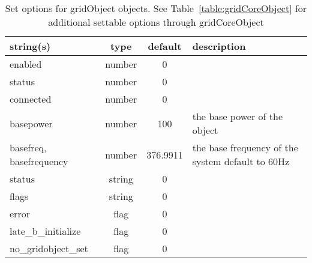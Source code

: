 \begin{table}[ht]
\centering
\begin{tabular}{p{5cm} c c p{7cm}}
\hline
string(s) & type & default & description \\
\hline
enabled & number & 0 & \\
status & number & 0 & \\
connected & number & 0 & \\
basepower & number & 100 & the base power of the object\\
basefreq, basefrequency & number & 376.9911 & the base frequency of the system default to 60Hz\\
status & string & 0 & \\
flags & string & 0 & \\
error & flag & 0 & \\
late\_b\_initialize & flag & 0 & \\
no\_gridobject\_set & flag & 0 & \\
\hline
\end{tabular}
\caption{Set options for gridObject objects. See Table~\ref{table:gridCoreObject} for additional settable options through gridCoreObject}
\label{table:gridObject}
\end{table}
